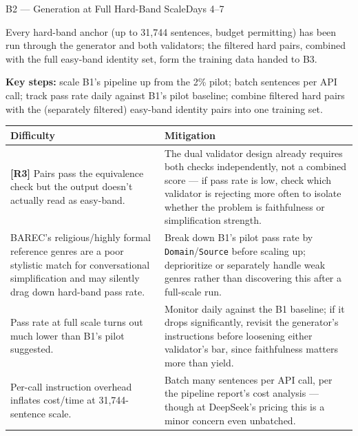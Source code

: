 \documentclass[11pt,a4paper]{article}
\begin{document}
\newpage
\begin{milestonehead}{B2 --- Generation at Full Hard-Band Scale}{Days 4--7}
\begin{goalbox}
Every hard-band anchor (up to 31,744 sentences, budget permitting) has been
run through the generator and both validators; the filtered hard pairs,
combined with the full easy-band identity set, form the training data
handed to B3.
\end{goalbox}

\textbf{Key steps:} scale B1's pipeline up from the 2\% pilot; batch
sentences per API call; track pass rate daily against B1's pilot baseline;
combine filtered hard pairs with the (separately filtered) easy-band
identity pairs into one training set.

\begin{center}
\small
\begin{tabular}{@{}p{6.3cm}p{6.9cm}@{}}
\toprule
\textbf{Difficulty} & \textbf{Mitigation} \\
\midrule
\textbf{[R3]} Pairs pass the equivalence check but the output doesn't
actually read as easy-band. & The dual validator design already requires
both checks independently, not a combined score --- if pass rate is low,
check which validator is rejecting more often to isolate whether the
problem is faithfulness or simplification strength. \\
\addlinespace
BAREC's religious/highly formal reference genres are a poor stylistic match
for conversational simplification and may silently drag down hard-band
pass rate. & Break down B1's pilot pass rate by \texttt{Domain}/\texttt{Source}
before scaling up; deprioritize or separately handle weak genres rather than
discovering this after a full-scale run. \\
\addlinespace
Pass rate at full scale turns out much lower than B1's pilot suggested. &
Monitor daily against the B1 baseline; if it drops significantly, revisit
the generator's instructions before loosening either validator's bar, since
faithfulness matters more than yield. \\
\addlinespace
Per-call instruction overhead inflates cost/time at 31,744-sentence scale. &
Batch many sentences per API call, per the pipeline report's cost analysis
--- though at DeepSeek's pricing this is a minor concern even unbatched. \\
\bottomrule
\end{tabular}
\end{center}
\end{milestonehead}
\end{document}
